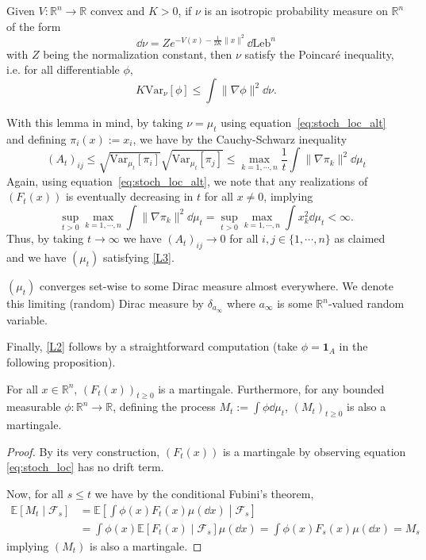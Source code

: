\begin{lemma}\label{lem:brascamp-lieb}
  Given \(V : \mathbb{R}^n \to \mathbb{R}\) convex and \(K > 0\), if \(\nu\) is an isotropic probability 
  measure on \(\mathbb{R}^n\) of the form 
  \[\dd \nu = Ze^{-V(x) - \frac{1}{2K}\|x\|^2}\dd \text{Leb}^n\]
  with \(Z\) being the normalization constant, then \(\nu\) satisfy the Poincaré inequality, i.e. 
  for all differentiable \(\phi\),
  \[K\text{Var}_\nu[\phi] \le \int \|\nabla\phi\|^2 \dd\nu.\]
\end{lemma}

With this lemma in mind, by taking \(\nu = \mu_t\) using 
equation~\eqref{eq:stoch_loc_alt} and defining
\(\pi_i(x) := x_i\), we have by the Cauchy-Schwarz inequality
\[(A_t)_{ij} \le \sqrt{\text{Var}_{\mu_t}[\pi_i]}\sqrt{\text{Var}_{\mu_t}[\pi_j]} 
  \le \max_{k = 1, \cdots, n} \frac{1}{t}\int \|\nabla \pi_k\|^2 \dd \mu_t\]
Again, using equation~\eqref{eq:stoch_loc_alt}, we note that any realizations of \((F_t(x))\) is eventually 
decreasing in \(t\) for all \(x \neq 0\), implying 
\[\sup_{t > 0} \max_{k = 1, \cdots, n} \int \|\nabla \pi_k\|^2 \dd \mu_t = 
\sup_{t > 0} \max_{k = 1, \cdots, n} \int x_k^2 \dd \mu_t < \infty.\] 
Thus, by taking \(t \to \infty\) we have \((A_t)_{ij} \to 0\) for all \(i, j \in \{1, \cdots, n\}\) as claimed 
and we have \((\mu_t)\) satisfying \ref{L3}.

\begin{corollary}
  \((\mu_t)\) converges set-wise to some Dirac measure almost everywhere. We denote this 
  limiting (random) Dirac measure by \(\delta_{a_\infty}\) where \(a_\infty\) is some 
  \(\mathbb{R}^n\)-valued random variable.
\end{corollary}

Finally, \ref{L2} follows by a straightforward computation (take \(\phi = \mathbf{1}_A\) in the following 
proposition).

\begin{proposition}
  For all \(x \in \mathbb{R}^n\), \((F_t(x))_{t \ge 0}\) is a martingale. Furthermore, for any 
  bounded measurable \(\phi : \mathbb{R}^n \to \mathbb{R}\), defining the process 
  \(M_t := \int \phi \dd \mu_t\), \((M_t)_{t \ge 0}\) is also a martingale.
\end{proposition}
\begin{proof}
  By its very construction, \((F_t(x))\) is a martingale by observing equation \ref{eq:stoch_loc} has no 
  drift term.
  
  Now, for all \(s \le t\) we have by the conditional Fubini's theorem,
  \begin{align*}
    \mathbb{E}[M_t \mid \mathscr{F}_s] 
    & = \mathbb{E}\left[\int \phi(x) F_t(x) \mu(\dd x) \middle\vert \mathscr{F}_s\right]\\
    & = \int \phi(x) \mathbb{E}[F_t(x) \mid \mathscr{F}_s] \mu(\dd x) 
    = \int \phi(x) F_s(x) \mu(\dd x)
    = M_s
  \end{align*}
  implying \((M_t)\) is also a martingale.
\end{proof}

